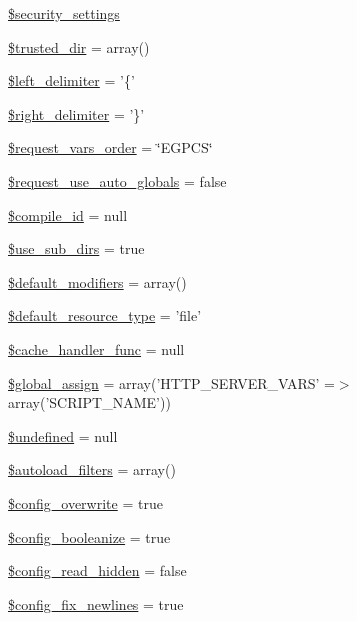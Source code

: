 \begin{DoxyCompactItemize}
\hyperlink{class_smarty_a905ec38d7cf957e041a8ed941320e5af}{\$security\-\_\-settings}
\item 
\hyperlink{class_smarty_a4541edfa0e2dd6b0e4b1da10c14fa52c}{\$trusted\-\_\-dir} = array()
\item 
\hyperlink{class_smarty_a77e272b1cacbab4b26b4fe515e445178}{\$left\-\_\-delimiter} = '\{'
\item 
\hyperlink{class_smarty_ad3fe9ebfa998625e29836badfe1840bd}{\$right\-\_\-delimiter} = '\}'
\item 
\hyperlink{class_smarty_a03919f6e9cba8f50093023e78b0fc6aa}{\$request\-\_\-vars\-\_\-order} = \char`\"{}\-E\-G\-P\-C\-S\char`\"{}
\item 
\hyperlink{class_smarty_a639bdb97701da08b49252c5dbe667930}{\$request\-\_\-use\-\_\-auto\-\_\-globals} = false
\item 
\hyperlink{class_smarty_a4c29af6f98e3049de95861b01a7bb00d}{\$compile\-\_\-id} = null
\item 
\hyperlink{class_smarty_a9d2c3aa18168752d2a32b5aac08b25cd}{\$use\-\_\-sub\-\_\-dirs} = true
\item 
\hyperlink{class_smarty_a48ec112144d4921e3a31fb1a5526ad2f}{\$default\-\_\-modifiers} = array()
\item 
\hyperlink{class_smarty_a35cf3764fb77e481ca92ef131a35ca7e}{\$default\-\_\-resource\-\_\-type} = 'file'
\item 
\hyperlink{class_smarty_a212fee0b84704db751e24b434177a478}{\$cache\-\_\-handler\-\_\-func} = null
\item 
\hyperlink{class_smarty_a23220583cbe0636d93101b05d757d76e}{\$global\-\_\-assign} = array('\-H\-T\-T\-P\-\_\-\-S\-E\-R\-V\-E\-R\-\_\-\-V\-A\-R\-S' =$>$ array('\-S\-C\-R\-I\-P\-T\-\_\-\-N\-A\-M\-E'))
\item 
\hyperlink{class_smarty_a7b9e122920a6696307fca34a3e041a9a}{\$undefined} = null
\item 
\hyperlink{class_smarty_aca2078dde09728b223cdffe8209e6dcc}{\$autoload\-\_\-filters} = array()
\item 
\hyperlink{class_smarty_a728421c1493ea20b619459924184b06d}{\$config\-\_\-overwrite} = true
\item 
\hyperlink{class_smarty_ab3e274a6c3fd439b83380c17a71255bb}{\$config\-\_\-booleanize} = true
\item 
\hyperlink{class_smarty_add257cafa2cc7f2c68381f9bcc6f4d7b}{\$config\-\_\-read\-\_\-hidden} = false
\item 
\hyperlink{class_smarty_a4df07d516adb04c09b5f77b556d3b5bc}{\$config\-\_\-fix\-\_\-newlines} = true

\end{DoxyCompactItemize}
